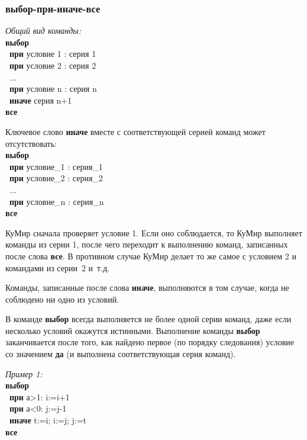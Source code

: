 \documentclass[12pt,a4paper]{article}
\newcommand{\otstup}{\textperiodcentered\ }
\begin{document}
\subsubsection{выбор-при-иначе-все}

\emph{Общий вид команды:}\\
{\sffamily
\textbf{выбор}\\
\otstup \textbf{при} условие 1 : серия 1\\
\otstup \textbf{при} условие 2 : серия 2\\
\otstup ...\\
\otstup \textbf{при} условие n : серия n\\
\otstup \textbf{иначе} серия n+1\\
\textbf{все}
}

Ключевое слово \textbf{иначе} вместе с соответствующей серией команд может отсутствовать:\\
{\sffamily
\textbf{выбор}\\
\otstup \textbf{при} условие\_1 : серия\_1\\
\otstup \textbf{при} условие\_2 : серия\_2\\
\otstup ...\\
\otstup \textbf{при} условие\_n : серия\_n\\
\textbf{все}
}

КуМир сначала проверяет условие 1. Если оно соблюдается, то КуМир выполняет команды из серии 1, после чего переходит к выполнению команд, записанных после слова \textbf{все}. В противном случае КуМир делает то же самое с условием 2 и командами из серии~2 и~т.д.

Команды, записанные после слова \textbf{иначе}, выполняются в том случае, когда не соблюдено ни одно из условий.

В команде \textbf{выбор} всегда выполняется не более одной серии команд, даже если несколько условий окажутся истинными. Выполнение команды \textbf{выбор} заканчивается после того, как найдено первое (по порядку следования) условие со значением \textbf{да} (и выполнена соответствующая серия команд). 

\emph{Пример 1:}\\
{\sffamily
\textbf{выбор}\\
\otstup \textbf{при} а>1: i:=i+1\\
\otstup \textbf{при} а<0: j:=j-1\\
\otstup \textbf{иначе} t:=i; i:=j; j:=t\\
\textbf{все}
}
\end{document}
